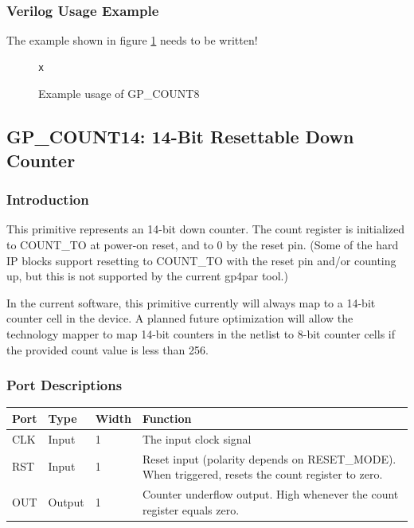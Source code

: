 \documentclass{article}
\begin{document}
\subsubsection{Verilog Usage Example}

The example shown in figure \ref{gp-count8-example} needs to be written!

\begin{figure}[h]
\begin{lstlisting}
x
\end{lstlisting}
\caption{Example usage of GP\_COUNT8}
\label{gp-count8-example}
\end{figure}


\pagebreak
\subsection{GP\_COUNT14: 14-Bit Resettable Down Counter}

\subsubsection{Introduction}
This primitive represents an 14-bit down counter. The count register is initialized to COUNT\_TO at power-on reset, and 
to 0 by the reset pin. (Some of the hard IP blocks support resetting to COUNT\_TO with the reset pin and/or counting 
up, but this is not supported by the current gp4par tool.)

In the current software, this primitive currently will always map to a 14-bit counter cell in the device. A planned 
future optimization will allow the technology mapper to map 14-bit counters in the netlist to 8-bit counter cells if 
the provided count value is less than 256.

\subsubsection{Port Descriptions}

\begin{tabularx}{5in}{|l|l|l|X|}
\hline
{\bfseries Port} & {\bfseries Type} & {\bfseries Width} & {\bfseries Function} \\
\hline
CLK & Input & 1 & The input clock signal\\
\hline
RST & Input & 1 & Reset input (polarity depends on RESET\_MODE). When triggered, resets the count register to zero. \\
\hline
OUT & Output & 1 & Counter underflow output. High whenever the count register equals zero. \\
\hline
\end{tabularx}
\end{document}
